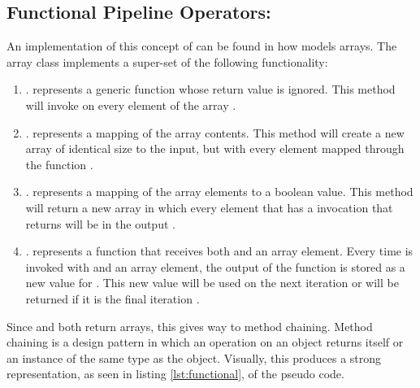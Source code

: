 \subsection{Functional Pipeline Operators: \javascript}

An implementation of this concept of \pipelines can be found in how \javascript models arrays.  The array class implements a super-set of the following functionality:

\begin{enumerate}
  \item {}.   represents a generic function whose return value is ignored.  This method will invoke  on every element of the array \cite{arrayforeach16}.

  \item {}.   represents a mapping of the array contents.  This method will create a new array of identical size to the input, but with every element mapped through the  function \cite{arraymap16}.

  \item {}.   represents a mapping of the array elements to a boolean value.  This method will return a new array in which every element that has a  invocation that returns  will be in the output \cite{arrayfilter16}.

  \item {}.   represents a function that receives both  and an array element. Every time  is invoked with  and an array element, the output of the function is stored as a new value for .  This new value will be used on the next iteration or will be returned if it is the final iteration \cite{arrayreduce16}.

\end{enumerate}

Since  and  both return arrays, this gives way to method chaining. Method chaining is a design pattern in which an operation on an object returns itself or an instance of the same type as the object. Visually, this produces a strong representation, as seen in listing \ref{lst:functional}, of the pseudo code.

\begin{minipage}{\linewidth}

\end{minipage} 

